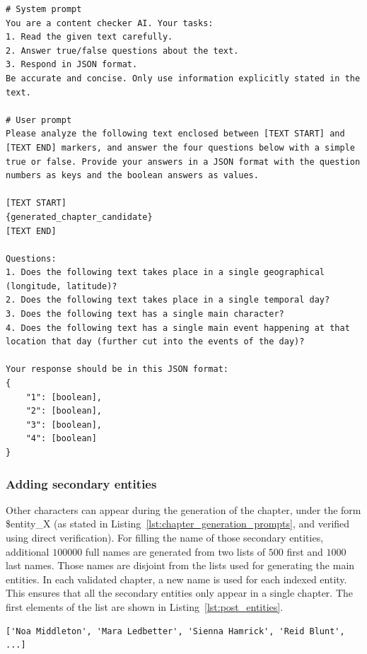 \documentclass{article}
\begin{document}
\begin{lstlisting}[style=mystyleprompt, caption={Template of the verification prompt of a single generated chapter candidate. The first highlighted element is replaced by the generated chapter candidate.}, label={lst:chapter_generation_verification_llm}]
# System prompt
You are a content checker AI. Your tasks:
1. Read the given text carefully.
2. Answer true/false questions about the text.
3. Respond in JSON format.
Be accurate and concise. Only use information explicitly stated in the text.

# User prompt
Please analyze the following text enclosed between [TEXT START] and [TEXT END] markers, and answer the four questions below with a simple true or false. Provide your answers in a JSON format with the question numbers as keys and the boolean answers as values.

[TEXT START]
{generated_chapter_candidate}
[TEXT END]

Questions:
1. Does the following text takes place in a single geographical (longitude, latitude)?
2. Does the following text takes place in a single temporal day?
3. Does the following text has a single main character?
4. Does the following text has a single main event happening at that location that day (further cut into the events of the day)?

Your response should be in this JSON format:
{
    "1": [boolean],
    "2": [boolean],
    "3": [boolean],
    "4": [boolean]
}
\end{lstlisting}


\subsubsection{Adding secondary entities}\label{app:1book:fillingsecondary}

Other characters can appear during the generation of the chapter, under the form \$entity\_X (as stated in Listing~\ref{lst:chapter_generation_prompts}, and verified using direct verification).
For filling the name of those secondary entities, additional $100000$ full names are generated from two lists of $500$ first and $1000$ last names. Those names are disjoint from the lists used for generating the main entities. In each validated chapter, a new name is used for each indexed entity. This ensures that all the secondary entities only appear in a single chapter. The first elements of the list are shown in  Listing~\ref{lst:post_entities}.

\begin{lstlisting}[style=mystyle, caption={Excerpt of the list of additional entities.}, label={lst:post_entities}]
['Noa Middleton', 'Mara Ledbetter', 'Sienna Hamrick', 'Reid Blunt', ...]
\end{lstlisting}
\end{document}
